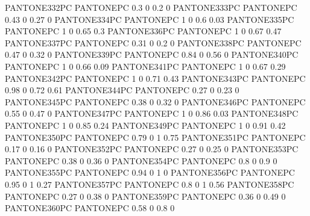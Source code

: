 {PANTONE332PC} {PANTONE\SpotSpace PC} {0.3 0 0.2 0}
 {PANTONE333PC} {PANTONE\SpotSpace PC} {0.43 0 0.27 0}
 {PANTONE334PC} {PANTONE\SpotSpace PC} {1 0 0.6 0.03}
 {PANTONE335PC} {PANTONE\SpotSpace PC} {1 0 0.65 0.3}
 {PANTONE336PC} {PANTONE\SpotSpace PC} {1 0 0.67 0.47}
 {PANTONE337PC} {PANTONE\SpotSpace PC} {0.31 0 0.2 0}
 {PANTONE338PC} {PANTONE\SpotSpace PC} {0.47 0 0.32 0}
 {PANTONE339PC} {PANTONE\SpotSpace PC} {0.84 0 0.56 0}
 {PANTONE340PC} {PANTONE\SpotSpace PC} {1 0 0.66 0.09}
 {PANTONE341PC} {PANTONE\SpotSpace PC} {1 0 0.67 0.29}
 {PANTONE342PC} {PANTONE\SpotSpace PC} {1 0 0.71 0.43}
 {PANTONE343PC} {PANTONE\SpotSpace PC} {0.98 0 0.72 0.61}
 {PANTONE344PC} {PANTONE\SpotSpace PC} {0.27 0 0.23 0}
 {PANTONE345PC} {PANTONE\SpotSpace PC} {0.38 0 0.32 0}
 {PANTONE346PC} {PANTONE\SpotSpace PC} {0.55 0 0.47 0}
 {PANTONE347PC} {PANTONE\SpotSpace PC} {1 0 0.86 0.03}
 {PANTONE348PC} {PANTONE\SpotSpace PC} {1 0 0.85 0.24}
 {PANTONE349PC} {PANTONE\SpotSpace PC} {1 0 0.91 0.42}
 {PANTONE350PC} {PANTONE\SpotSpace PC} {0.79 0 1 0.75}
 {PANTONE351PC} {PANTONE\SpotSpace PC} {0.17 0 0.16 0}
 {PANTONE352PC} {PANTONE\SpotSpace PC} {0.27 0 0.25 0}
 {PANTONE353PC} {PANTONE\SpotSpace PC} {0.38 0 0.36 0}
 {PANTONE354PC} {PANTONE\SpotSpace PC} {0.8 0 0.9 0}
 {PANTONE355PC} {PANTONE\SpotSpace PC} {0.94 0 1 0}
 {PANTONE356PC} {PANTONE\SpotSpace PC} {0.95 0 1 0.27}
 {PANTONE357PC} {PANTONE\SpotSpace PC} {0.8 0 1 0.56}
 {PANTONE358PC} {PANTONE\SpotSpace PC} {0.27 0 0.38 0}
 {PANTONE359PC} {PANTONE\SpotSpace PC} {0.36 0 0.49 0}
 {PANTONE360PC} {PANTONE\SpotSpace PC} {0.58 0 0.8 0}
